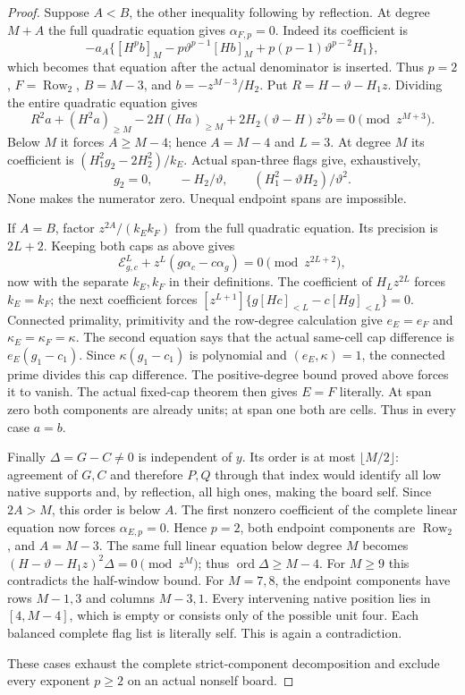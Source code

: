 \documentclass[11pt,a4paper]{amsart}
\numberwithin{equation}{section}
\theoremstyle{plain}
\theoremstyle{definition}
\newcommand{\ord}{\operatorname{ord}}
\newcommand{\Row}{\operatorname{Row}}
\begin{document}
\begin{proof}
Suppose \(A<B\), the other inequality following by reflection.
At degree \(M+A\) the full quadratic equation gives
\(\alpha_{F,p}=0\).
Indeed its coefficient is
\[
 -a_A\{[H^pb]_M-p\vartheta^{p-1}[Hb]_M
                         +p(p-1)\vartheta^{p-2}H_1\},
\]
which becomes that equation after the actual denominator is inserted.
Thus \(p=2\), \(F=\Row_2\), \(B=M-3\), and
\(b=-z^{M-3}/H_2\).
Put \(R=H-\vartheta-H_1z\).  Dividing the entire quadratic equation gives
\[
 R^2a+(H^2a)_{\ge M}-2H(Ha)_{\ge M}
                  +2H_2(\vartheta-H)z^2b=0\pmod{z^{M+3}}.
\]
Below \(M\) it forces \(A\ge M-4\); hence \(A=M-4\) and \(L=3\).
At degree \(M\) its coefficient is
\((H_1^2g_2-2H_2^2)/k_E\).
Actual span-three flags give, exhaustively,
\[
 g_2=0,\qquad -H_2/\vartheta,\qquad (H_1^2-\vartheta H_2)/\vartheta^2.
\]
None makes the numerator zero.  Unequal endpoint spans are impossible.

If \(A=B\), factor \(z^{2A}/(k_Ek_F)\) from the full quadratic
equation.  Its precision is \(2L+2\).
Keeping both caps as above gives
\[
 \mathcal{E}^{L}_{g,c}
       +z^L(g\alpha_c-c\alpha_g)=0\pmod{z^{2L+2}},
\]
now with the separate \(k_E,k_F\) in their definitions.
The coefficient of \(H_Lz^{2L}\) forces \(k_E=k_F\); the next
coefficient forces
\([z^{L+1}]\{g[Hc]_{<L}-c[Hg]_{<L}\}=0\).
Connected primality, primitivity and the row-degree calculation give
\(e_E=e_F\) and \(\kappa_E=\kappa_F=\kappa\).
The second equation says that the actual same-cell cap difference is
\(e_E(g_1-c_1)\).  Since \(\kappa(g_1-c_1)\) is polynomial and
\((e_E,\kappa)=1\), the connected prime divides this cap difference.
The positive-degree bound proved above forces it to vanish.
The actual fixed-cap theorem then gives \(E=F\) literally.
At span zero both components are already units; at span one both are
cells.  Thus in every case \(a=b\).

Finally \(\Delta=G-C\ne0\) is independent of \(y\).
Its order is at most \(\lfloor M/2\rfloor\): agreement of \(G,C\)
and therefore \(P,Q\) through that index would identify all low
native supports and, by reflection, all high ones, making the board
self.  Since \(2A>M\), this order is below \(A\).
The first nonzero coefficient of the complete linear equation now
forces \(\alpha_{E,p}=0\).
Hence \(p=2\), both endpoint components are \(\Row_2\), and \(A=M-3\).
The same full linear equation below degree \(M\) becomes
\((H-\vartheta-H_1z)^2\Delta=0\pmod{z^M}\); thus
\(\ord\Delta\ge M-4\).
For \(M\ge9\) this contradicts the half-window bound.
For \(M=7,8\), the endpoint components have rows \(M-1,3\) and columns
\(M-3,1\).  Every intervening native position lies in
\([4,M-4]\), which is empty or consists only of the possible unit four.
Each balanced complete flag list is literally self.  This is again
a contradiction.

These cases exhaust the complete strict-component decomposition and
exclude every exponent \(p\ge2\) on an actual nonself board.
\end{proof}
\end{document}

